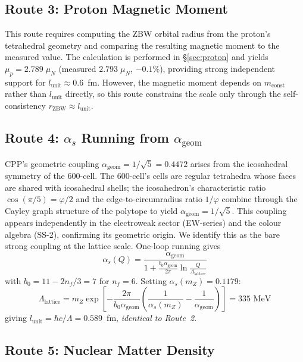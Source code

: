 \documentclass[12pt,a4paper]{article}
\begin{document}
\subsection{Route 3: Proton Magnetic Moment}
\label{sec:route3}

This route requires computing the ZBW orbital radius from the proton's tetrahedral geometry and comparing the resulting magnetic moment to the measured value. The calculation is performed in \S\ref{sec:proton} and yields $\mu_p = 2.789\;\mu_N$ (measured $2.793\;\mu_N$, $-0.1\%$), providing strong independent support for $l_{\mathrm{unit}} \approx 0.6$~fm. However, the magnetic moment depends on $m_{\mathrm{const}}$ rather than $l_{\mathrm{unit}}$ directly, so this route constrains the scale only through the self-consistency $r_{\mathrm{ZBW}} \approx l_{\mathrm{unit}}$.

\subsection{Route 4: $\alpha_s$ Running from $\alpha_{\mathrm{geom}}$}
\label{sec:route4}

CPP's geometric coupling $\alpha_{\mathrm{geom}} = 1/\sqrt{5} = 0.4472$ arises from the icosahedral symmetry of the 600-cell. The 600-cell's cells are regular tetrahedra whose faces are shared with icosahedral shells; the icosahedron's characteristic ratio $\cos(\pi/5) = \varphi/2$ and the edge-to-circumradius ratio $1/\varphi$ combine through the Cayley graph structure of the polytope to yield $\alpha_{\mathrm{geom}} = 1/\sqrt{5}$. This coupling appears independently in the electroweak sector (EW-series) and the colour algebra (SS-2), confirming its geometric origin. We identify this as the bare strong coupling at the lattice scale. One-loop running gives
\begin{equation}
\alpha_s(Q) = \frac{\alpha_{\mathrm{geom}}}{1 + \frac{b_0 \alpha_{\mathrm{geom}}}{2\pi}\ln\frac{Q}{\Lambda_{\mathrm{lattice}}}}
\label{eq:running}
\end{equation}
with $b_0 = 11 - 2n_f/3 = 7$ for $n_f = 6$. Setting $\alpha_s(m_Z) = 0.1179$:
\begin{equation}
\Lambda_{\mathrm{lattice}} = m_Z \exp\!\left[-\frac{2\pi}{b_0\alpha_{\mathrm{geom}}}\left(\frac{1}{\alpha_s(m_Z)} - \frac{1}{\alpha_{\mathrm{geom}}}\right)\right] = 335 \text{ MeV}
\end{equation}
giving $l_{\mathrm{unit}} = \hbar c / \Lambda = 0.589$~fm, \emph{identical to Route~2}.

\subsection{Route 5: Nuclear Matter Density}
\end{document}
